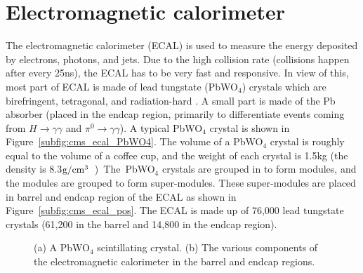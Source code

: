 \section{Electromagnetic calorimeter}
The electromagnetic calorimeter (ECAL) is used to measure the energy deposited by 
electrons, photons, and jets. Due to the high collision rate (collisions happen after 
every 25\unit{ns}), the ECAL has to be very fast and responsive. In view of this, most 
part of ECAL is made of lead tungstate (PbWO$_4$) crystals which are birefringent,
tetragonal, and radiation-hard \cite{PbWO4}. A small part is made of the Pb absorber
(placed in the endcap region, primarily to differentiate events coming from 
$H\rightarrow \gamma\gamma$ and $\pi^0 \rightarrow \gamma\gamma$). A typical PbWO$_4$ 
crystal is shown in Figure~\ref{subfig:cms_ecal_PbWO4}. The volume of a PbWO$_4$ crystal is 
roughly equal to the volume of a coffee cup, and the weight of each crystal is 1.5\unit{kg} (the 
density is 8.3\unit{$\rm g/\rm {cm}^3$}). 
The PbWO$_4$ crystals are grouped in to form modules, and the modules are grouped to form 
super-modules. These super-modules are placed in barrel and endcap region of the ECAL as 
shown in Figure~\ref{subfig:cms_ecal_pos}. The ECAL is made up of 76,000 lead tungstate 
crystals (61,200 in the barrel and 14,800 in the endcap region).
\begin{figure}
  \centering
	 \hfil
 	\caption{(a) A PbWO$_4$ scintillating crystal. (b) The various components of the 
	electromagnetic calorimeter in the barrel and endcap regions.}
 	\label{fig:cms_ecal}
\end{figure}

